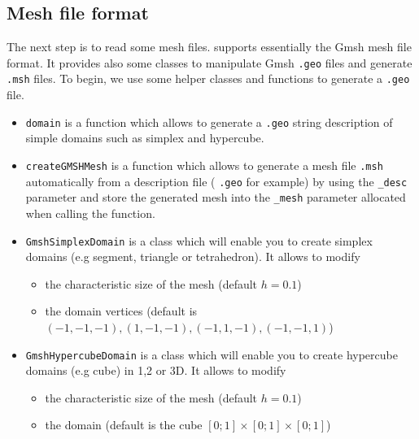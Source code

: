 
%

\subsection{Mesh file format}
The next step is to read some mesh files. \feel supports essentially the Gmsh mesh file format. It provides also some classes to manipulate Gmsh \lstinline!.geo! files and generate \lstinline!.msh! files. To begin, we use some helper classes and functions to generate a \lstinline!.geo! file.

\begin{itemize}
\item \lstinline!domain! is a function which allows to generate a \verb|.geo| string description of simple domains such as simplex and hypercube.

\item \lstinline!createGMSHMesh! is a function which allows to generate a mesh file \verb|.msh| automatically from a description file ( \verb|.geo| for example) by using the \verb|_desc| parameter and store the generated mesh into the \verb|_mesh| parameter allocated when calling the function.

\item \lstinline!GmshSimplexDomain! is a class which will enable you to create simplex domains (e.g segment, triangle or tetrahedron). It allows to modify 
  	\begin{itemize}
	 \item the characteristic size of the mesh (default $h=0.1$)
  	\item the domain vertices (default is $(-1,-1,-1), (1,-1,-1), (-1,1,-1), (-1,-1,1)$)
  	\end{itemize}		

\item \lstinline!GmshHypercubeDomain! is a class which will enable you to create hypercube domains (e.g cube) in 1,2 or 3D. It allows to modify 
  	\begin{itemize}
  	\item the characteristic size of the mesh (default $h=0.1$)
  	\item the domain (default is the cube $[0;1]\times[0;1]\times[0;1]$)
  	\end{itemize}
\end{itemize}


